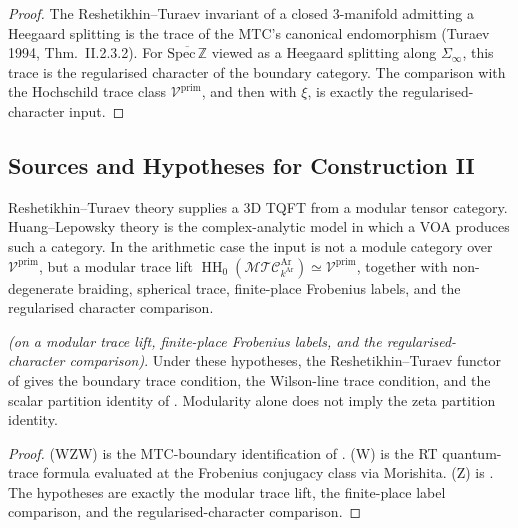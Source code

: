 \begin{proof}
The Reshetikhin--Turaev invariant of a closed 3-manifold admitting
a Heegaard splitting is the trace of the MTC's canonical endomorphism
(Turaev 1994, Thm.~II.2.3.2). For
\(\overline{\mathrm{Spec}\,\mathbb{Z}}\) viewed as a Heegaard splitting
along \(\Sigma_{\infty}\), this trace is the regularised character of
the boundary category. The comparison with the Hochschild trace class
\(\mathcal V^{\mathrm{prim}}\), and then with \(\xi\), is exactly the
regularised-character input.
\end{proof}

\subsection{Sources and Hypotheses for Construction II}
\label{v4-arith:w10-a:ah:construction-II}

Reshetikhin--Turaev theory supplies a 3D TQFT from a modular tensor
category. Huang--Lepowsky theory is the complex-analytic model in
which a VOA produces such a category. In the arithmetic case the input
is not a module category over \(\mathcal V^{\mathrm{prim}}\), but a
modular trace lift
\(\operatorname{HH}_{0}(\mathcal{MTC}^{\mathrm{Ar}}_{k^{\mathrm{Ar}}})
\simeq\mathcal V^{\mathrm{prim}}\), together with non-degenerate
braiding, spherical trace, finite-place Frobenius labels, and the
regularised character comparison.

\begin{theorem}
\label{v4-arith:w10-a:thm:construction-II-closure}
\ClaimStatusProvedHereConditional \emph{(on a modular trace lift,
finite-place Frobenius labels, and the regularised-character
comparison)}. Under these hypotheses, the Reshetikhin--Turaev functor
of  gives the boundary trace
condition, the Wilson-line trace condition, and the scalar partition
identity of . Modularity alone does
not imply the zeta partition identity.
\end{theorem}

\begin{proof}
(WZW) is the MTC-boundary identification of
. (W) is the RT quantum-trace
formula evaluated at the Frobenius conjugacy class via Morishita.
(Z) is . The hypotheses are exactly
the modular trace lift, the finite-place label comparison, and the
regularised-character comparison.
\end{proof}

